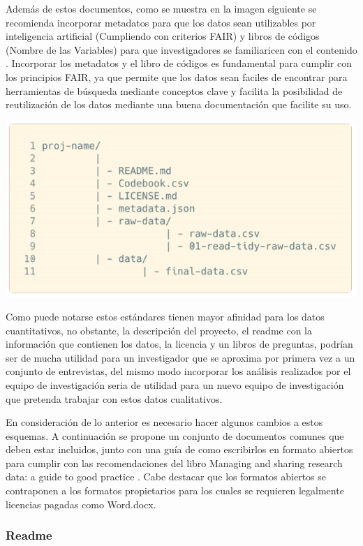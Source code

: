 \documentclass[
  14pt,
]{book}
\begin{document}
Además de estos documentos, como se muestra en la imagen siguiente se recomienda incorporar metadatos para que los datos sean utilizables por inteligencia artificial (Cumpliendo con criterios FAIR) y libros de códigos (Nombre de las Variables) para que investigadores se familiaricen con el contenido \citep{tierney_Realistic_2020}. Incorporar los metadatos y el libro de códigos es fundamental para cumplir con los principios FAIR, ya que permite que los datos sean faciles de encontrar para herramientas de búsqueda mediante conceptos clave y facilita la posibilidad de reutilización de los datos mediante una buena documentación que facilite su uso.

\begin{center}\includegraphics[width=0.5\linewidth,]{images/esquemadedatos} \end{center}

Como puede notarse estos estándares tienen mayor afinidad para los datos cuantitativos, no obstante, la descripción del proyecto, el readme con la información que contienen los datos, la licencia y un libros de preguntas, podrían ser de mucha utilidad para un investigador que se aproxima por primera vez a un conjunto de entrevistas, del mismo modo incorporar los análisis realizados por el equipo de investigación seria de utilidad para un nuevo equipo de investigación que pretenda trabajar con estos datos cualitativos.

En consideración de lo anterior es necesario hacer algunos cambios a estos esquemas. A continuación se propone un conjunto de documentos comunes que deben estar incluidos, junto con una guía de como escribirlos en formato abiertos para cumplir con las recomendaciones del libro Managing and sharing research data: a guide to good practice \citep{corti_Managing_2019}. Cabe destacar que los formatos abiertos se contraponen a los formatos propietarios para los cuales se requieren legalmente licencias pagadas como Word.docx.

\hypertarget{readme}{%
\subsubsection{Readme}\label{readme}}
\end{document}
